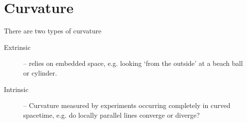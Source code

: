 \section{Curvature}
There are two types of curvature
\begin{description}
    \item[Extrinsic] -- relies on embedded space, e.g. looking `from the outside' at a beach ball or cylinder.
    \item[Intrinsic] -- Curvature measured by experiments occurring completely in curved spacetime, e.g. do locally parallel lines converge or diverge?
\end{description}

